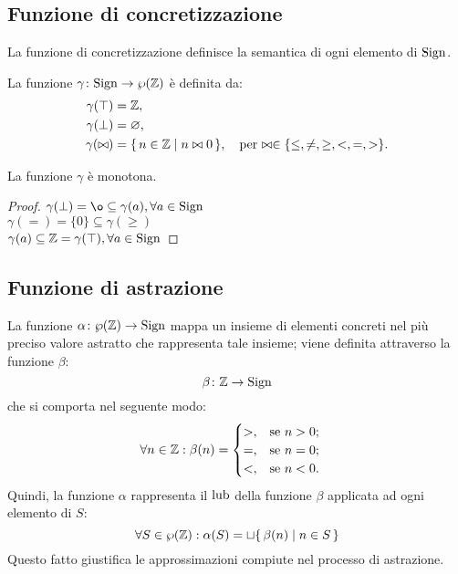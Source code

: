 \subsection{Funzione di concretizzazione}

La funzione di concretizzazione definisce la semantica di ogni
elemento di $\mathrm{Sign}$.
\begin{definizione} 
La funzione $\mathord{\gamma}\colon\mathrm{Sign}\to\wp(\mathbb{Z})$ è definita
da:
\begin{align*}
  \gamma(\top) &= \mathbb{Z}, \\
  \gamma(\bot) &= \varnothing, \\
  \gamma(\bowtie) &= \{\, n \in \mathbb{Z} \mid n \bowtie 0 \,\},
    \quad\text{per $\bowtie \in \{ \leq, \neq, \geq, <, =, > \}$.}
\end{align*}
\end{definizione}

\begin{proposizione}
La funzione $\gamma$ è monotona.
\end{proposizione}
\begin{proof}
	$ \gamma(\bot) = \o \subseteq \gamma(a) , \forall a \in \Sign $ \\
	$ \gamma(=) = \{0\} \subseteq \gamma(\geq) $ \\
	$ \gamma(a) \subseteq \mathbb{Z} = \gamma(\top), \forall a \in \mathrm{Sign} $
\end{proof}

\subsection{Funzione di astrazione}

\begin{definizione} 
La funzione $\mathord{\alpha}\colon\wp(\mathbb{Z})\to\mathrm{Sign}$ mappa un insieme
di elementi concreti nel più preciso valore astratto che rappresenta
tale insieme; viene definita attraverso la funzione $\beta$:
\[
	\mathord{\beta}\colon\mathbb{Z}\to\mathrm{Sign}
\]
che si comporta nel seguente modo:
\begin{align*}
	\forall n \in \mathbb{Z} \mathrel{:} \beta(n) &=
	\begin{cases}
		>,	&\text{se $n  >  0$;} \\
		=,	&\text{se $n = 0$;} \\
		<,	&\text{se $n < 0$.}
	\end{cases} 
\end{align*}
Quindi, la funzione $\alpha$ rappresenta il $\mathop{\mathrm{lub}}\nolimits$ della
funzione $\beta$ applicata ad ogni elemento di $S$:
\[
	\forall S \in \wp(\mathbb{Z}) \mathrel{:} \alpha(S) = \sqcup \{\, \beta(n) \mid n \in S \,\}
\]
Questo fatto giustifica le approssimazioni compiute nel processo
di astrazione.
\end{definizione}

